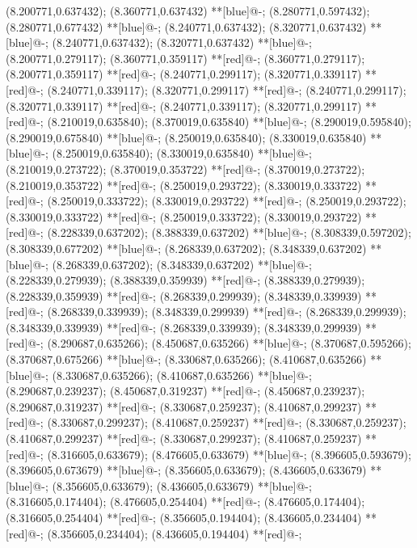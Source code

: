 (8.200771,0.637432); (8.360771,0.637432) **[blue]@{-};
(8.280771,0.597432); (8.280771,0.677432) **[blue]@{-};
(8.240771,0.637432); (8.320771,0.637432) **[blue]@{-};
(8.240771,0.637432); (8.320771,0.637432) **[blue]@{-};
(8.200771,0.279117); (8.360771,0.359117) **[red]@{-};
(8.360771,0.279117); (8.200771,0.359117) **[red]@{-};
(8.240771,0.299117); (8.320771,0.339117) **[red]@{-};
(8.240771,0.339117); (8.320771,0.299117) **[red]@{-};
(8.240771,0.299117); (8.320771,0.339117) **[red]@{-};
(8.240771,0.339117); (8.320771,0.299117) **[red]@{-};
(8.210019,0.635840); (8.370019,0.635840) **[blue]@{-};
(8.290019,0.595840); (8.290019,0.675840) **[blue]@{-};
(8.250019,0.635840); (8.330019,0.635840) **[blue]@{-};
(8.250019,0.635840); (8.330019,0.635840) **[blue]@{-};
(8.210019,0.273722); (8.370019,0.353722) **[red]@{-};
(8.370019,0.273722); (8.210019,0.353722) **[red]@{-};
(8.250019,0.293722); (8.330019,0.333722) **[red]@{-};
(8.250019,0.333722); (8.330019,0.293722) **[red]@{-};
(8.250019,0.293722); (8.330019,0.333722) **[red]@{-};
(8.250019,0.333722); (8.330019,0.293722) **[red]@{-};
(8.228339,0.637202); (8.388339,0.637202) **[blue]@{-};
(8.308339,0.597202); (8.308339,0.677202) **[blue]@{-};
(8.268339,0.637202); (8.348339,0.637202) **[blue]@{-};
(8.268339,0.637202); (8.348339,0.637202) **[blue]@{-};
(8.228339,0.279939); (8.388339,0.359939) **[red]@{-};
(8.388339,0.279939); (8.228339,0.359939) **[red]@{-};
(8.268339,0.299939); (8.348339,0.339939) **[red]@{-};
(8.268339,0.339939); (8.348339,0.299939) **[red]@{-};
(8.268339,0.299939); (8.348339,0.339939) **[red]@{-};
(8.268339,0.339939); (8.348339,0.299939) **[red]@{-};
(8.290687,0.635266); (8.450687,0.635266) **[blue]@{-};
(8.370687,0.595266); (8.370687,0.675266) **[blue]@{-};
(8.330687,0.635266); (8.410687,0.635266) **[blue]@{-};
(8.330687,0.635266); (8.410687,0.635266) **[blue]@{-};
(8.290687,0.239237); (8.450687,0.319237) **[red]@{-};
(8.450687,0.239237); (8.290687,0.319237) **[red]@{-};
(8.330687,0.259237); (8.410687,0.299237) **[red]@{-};
(8.330687,0.299237); (8.410687,0.259237) **[red]@{-};
(8.330687,0.259237); (8.410687,0.299237) **[red]@{-};
(8.330687,0.299237); (8.410687,0.259237) **[red]@{-};
(8.316605,0.633679); (8.476605,0.633679) **[blue]@{-};
(8.396605,0.593679); (8.396605,0.673679) **[blue]@{-};
(8.356605,0.633679); (8.436605,0.633679) **[blue]@{-};
(8.356605,0.633679); (8.436605,0.633679) **[blue]@{-};
(8.316605,0.174404); (8.476605,0.254404) **[red]@{-};
(8.476605,0.174404); (8.316605,0.254404) **[red]@{-};
(8.356605,0.194404); (8.436605,0.234404) **[red]@{-};
(8.356605,0.234404); (8.436605,0.194404) **[red]@{-};
